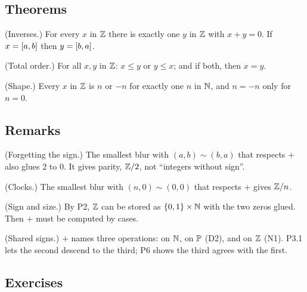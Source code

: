 \subsection*{Theorems}

\begin{lines}
\item[\lab{T1}] (Inverses.) For every $x$ in $\mathbb{Z}$ there is exactly one $y$ in $\mathbb{Z}$ with $x + y = 0$. If $x = [a,b]$ then $y = [b,a]$.
\item[\lab{T2}] (Total order.) For all $x,y$ in $\mathbb{Z}$: $x \le y$ or $y \le x$; and if both, then $x = y$.
\item[\lab{T3}] (Shape.) Every $x$ in $\mathbb{Z}$ is $n$ or $-n$ for exactly one $n$ in $\mathbb{N}$, and $n = -n$ only for $n = 0$.
\end{lines}

\subsection*{Remarks}

\begin{lines}
\item[\lab{R1}] (Forgetting the sign.) The smallest blur with $(a,b) \sim (b,a)$ that respects $+$ also glues $2$ to $0$. It gives parity, $\mathbb{Z}/2$, not ``integers without sign''.
\item[\lab{R2}] (Clocks.) The smallest blur with $(n,0) \sim (0,0)$ that respects $+$ gives $\mathbb{Z}/n$.
\item[\lab{R3}] (Sign and size.) By P2, $\mathbb{Z}$ can be stored as $\{0,1\} \times \mathbb{N}$ with the two zeros glued. Then $+$ must be computed by cases.
\end{lines}

\begin{lines}
\item[\lab{R4}] (Shared signs.) $+$ names three operations: on $\mathbb{N}$, on $\mathbb{P}$ (D2), and on $\mathbb{Z}$ (N1). P3.1 lets the second descend to the third; P6 shows the third agrees with the first.
\end{lines}

\subsection*{Exercises}

